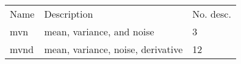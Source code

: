 \begin{tabular}{lll}
    Name & Description                       & No. desc. \\
    mvn  & mean, variance, and noise         & 3         \\
    mvnd & mean, variance, noise, derivative & 12       
\end{tabular}

